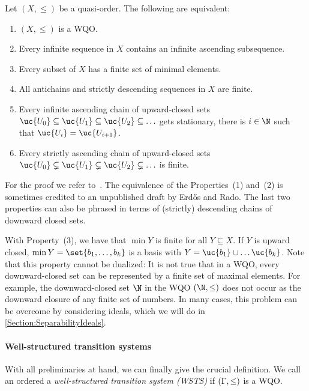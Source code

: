 \documentclass[../../diss.tex]{subfiles}
\begin{document}
\begin{lemma}%
\label{Lemma:WQOProperties}%
    Let $(X,\leq)$ be a quasi-order.
    The following are equivalent:
    \begin{enumerate}[(1)]
        \item $(X,\leq)$ is a WQO.\@
        \item Every infinite sequence in $X$ contains an infinite ascending subsequence.
        \item\label{Property:WQOFiniteBasis} Every subset of $X$ has a finite set of minimal elements.
        \item\label{Property:WQOAntichain} All antichains and strictly descending sequences in $X$ are finite.
        \item Every infinite ascending chain of upward-closed sets
        \(
            \uc{U_0} \subseteq \uc{U_1} \subseteq \uc{U_2} \subseteq \ldots
        \)
        gets stationary, \ie there is $i \in \N$ such that $ \uc{U_i} =  \uc{U_{i+1}}$.
        \item Every strictly ascending chain of upward-closed sets
        \(
            \uc{U_0} \subsetneq \uc{U_1} \subsetneq \uc{U_2} \subsetneq \ldots
        \)
        is finite.
    \end{enumerate}
\end{lemma}

For the proof we refer to~\cite{FinkelS01}.
The equivalence of the Properties~(1) and~(2) is sometimes credited to an unpublished draft by Erdős and Rado.
The last two properties can also be phrased in terms of (strictly) descending chains of downward closed sets.

With Property~(3), we have that $\min Y$ is finite for all $Y \subseteq X$.
If $Y$ is upward closed, $\min Y = \set{b_1, \ldots, b_k}$ is a basis with $Y = \uc{b_1} \cup \ldots \uc{b_k}$.
Note that this property cannot be dualized:
It is not true that in a WQO, every downward-closed set can be represented by a finite set of maximal elements.
For example, the downward-closed set $\N$ in the WQO $(\N,\leq)$ does not occur as the downward closure of any finite set of numbers.
In many cases, this problem can be overcome by considering ideals, which we will do in \cref{Section:SeparabilityIdeals}.

\paragraph{Well-structured transition systems}

With all preliminaries at hand, we can finally give the crucial definition.
We call an ordered  a \emph{well-structured transition system (WSTS)} if $(\Gamma,\leq)$ is a WQO.\@
\end{document}
